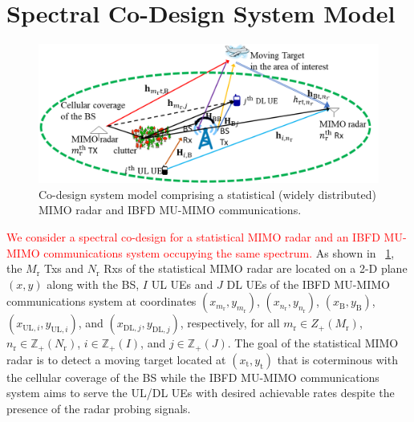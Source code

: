 \documentclass[10pt,journal]{IEEEtran}
\newcommand{\paren}[1]{\left({#1}\right)}
\theoremstyle{definition}
\begin{document}
\section{Spectral Co-Design System Model}
\label{sec:system}
 \begin{figure}[t]
	\centering
	\includegraphics[width=1\columnwidth]{setup_model_tsp.png}
	\caption{Co-design system model comprising a statistical (widely distributed) MIMO radar and IBFD MU-MIMO communications.}
	\label{fig:setup}
\end{figure}
\textcolor{red}{We consider a spectral co-design for a statistical MIMO radar and an IBFD MU-MIMO communications system occupying the same spectrum.} As shown in \figurename{~\ref{fig:setup}}, the $M_\mathrm{r}$ Txs and $N_\mathrm{r}$ Rxs of the statistical MIMO radar are located on a 2-D plane $\left(x,y \right)$ along with the BS, $I$ UL UEs and $J$ DL UEs of the IBFD MU-MIMO communications system at coordinates $\left(x_{m_\mathrm{r}},y_{m_\mathrm{r}}\right)$, $\left(x_{n_\mathrm{r}},y_{n_\mathrm{r}} \right)$,  $\paren{x_{\mathrm{B}},y_{\mathrm{B}}}$, $\paren{x_{\mathrm{UL},i},y_{\mathrm{UL},i}}$, and $\paren{x_{\mathrm{DL,}j},y_{\mathrm{DL},j}}$, respectively, for all $m_\mathrm{r}\in{Z}_{+}(M_\mathrm{r})$, $n_\mathrm{r}\in\mathbb{Z}_{+}\paren{N_\mathrm{r}}$, $i\in\mathbb{Z}_{+}\paren{I}$, and $j\in\mathbb{Z}_{+}\paren{J}$. The goal of the statistical MIMO radar is to detect a moving target located at $(x_{\mathrm{t}},y_{\mathrm{t}})$ that is coterminous with the cellular coverage of the BS while the IBFD MU-MIMO communications system aims to serve the UL/DL UEs with desired achievable rates despite the presence of the radar probing signals.  %
\end{document}
